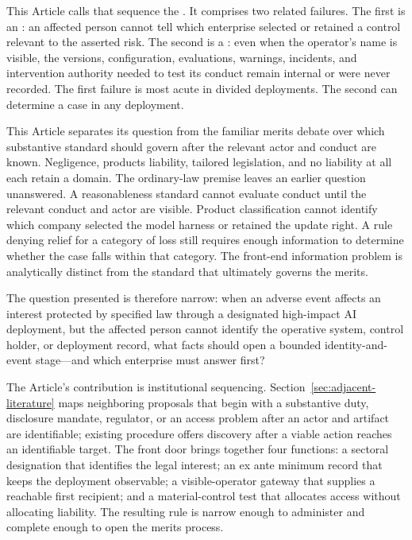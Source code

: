 This Article calls that sequence the . It comprises two related failures. The first is an : an affected person cannot tell which enterprise selected or retained a control relevant to the asserted risk. The second is a : even when the operator's name is visible, the versions, configuration, evaluations, warnings, incidents, and intervention authority needed to test its conduct remain internal or were never recorded. The first failure is most acute in divided deployments. The second can determine a case in any deployment.

This Article separates its question from the familiar merits debate over which substantive standard should govern after the relevant actor and conduct are known. Negligence, products liability, tailored legislation, and no liability at all each retain a domain. The ordinary-law premise leaves an earlier question unanswered. A reasonableness standard cannot evaluate conduct until the relevant conduct and actor are visible. Product classification cannot identify which company selected the model harness or retained the update right. A rule denying relief for a category of loss still requires enough information to determine whether the case falls within that category. The front-end information problem is analytically distinct from the standard that ultimately governs the merits.

The question presented is therefore narrow: when an adverse event affects an interest protected by specified law through a designated high-impact AI deployment, but the affected person cannot identify the operative system, control holder, or deployment record, what facts should open a bounded identity-and-event stage---and which enterprise must answer first?

The Article's contribution is institutional sequencing. Section~\ref{sec:adjacent-literature} maps neighboring proposals that begin with a substantive duty, disclosure mandate, regulator, or an access problem after an actor and artifact are identifiable; existing procedure offers discovery after a viable action reaches an identifiable target. The front door brings together four functions: a sectoral designation that identifies the legal interest; an ex ante minimum record that keeps the deployment observable; a visible-operator gateway that supplies a reachable first recipient; and a material-control test that allocates access without allocating liability. The resulting rule is narrow enough to administer and complete enough to open the merits process.

